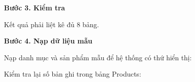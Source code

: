 \vspace{0.5em}\noindent\textbf{Bước 3. Kiểm tra}\par

\begin{Shaded}
\begin{Highlighting}[]
\end{Highlighting}
\end{Shaded}

Kết quả phải liệt kê đủ 8 bảng.

\vspace{0.5em}\noindent\textbf{Bước 4. Nạp dữ liệu
mẫu}\par

Nạp danh mục và sản phẩm mẫu để hệ thống có thứ hiển thị:

\begin{Shaded}
\begin{Highlighting}[]
\end{Highlighting}
\end{Shaded}

Kiểm tra lại số bản ghi trong bảng Products:

\begin{Shaded}
\begin{Highlighting}[]
\end{Highlighting}
\end{Shaded}
